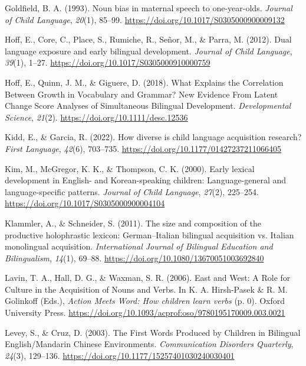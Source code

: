 \documentclass[10pt, letterpaper]{article}
\begin{document}
\begin{CSLReferences}{1}{0}
Goldfield, B. A. (1993). Noun bias in maternal speech to one-year-olds.
\emph{Journal of Child Language}, \emph{20}(1), 85--99.
\url{https://doi.org/10.1017/S0305000900009132}

Hoff, E., Core, C., Place, S., Rumiche, R., Señor, M., \& Parra, M.
(2012). Dual language exposure and early bilingual development.
\emph{Journal of Child Language}, \emph{39}(1), 1--27.
\url{https://doi.org/10.1017/S0305000910000759}

Hoff, E., Quinn, J. M., \& Giguere, D. (2018). What {Explains} the
{Correlation Between Growth} in {Vocabulary} and {Grammar}? {New
Evidence From Latent Change Score Analyses} of {Simultaneous Bilingual
Development}. \emph{Developmental Science}, \emph{21}(2).
\url{https://doi.org/10.1111/desc.12536}

Kidd, E., \& Garcia, R. (2022). How diverse is child language
acquisition research? \emph{First Language}, \emph{42}(6), 703--735.
\url{https://doi.org/10.1177/01427237211066405}

Kim, M., McGregor, K. K., \& Thompson, C. K. (2000). Early lexical
development in {English-} and {Korean-speaking} children:
Language-general and language-specific patterns. \emph{Journal of Child
Language}, \emph{27}(2), 225--254.
\url{https://doi.org/10.1017/S0305000900004104}

Klammler, A., \& Schneider, S. (2011). The size and composition of the
productive holophrastic lexicon: {German}--{Italian} bilingual
acquisition vs. {Italian} monolingual acquisition. \emph{International
Journal of Bilingual Education and Bilingualism}, \emph{14}(1), 69--88.
\url{https://doi.org/10.1080/13670051003692840}

Lavin, T. A., Hall, D. G., \& Waxman, S. R. (2006). East and {West}: {A
Role} for {Culture} in the {Acquisition} of {Nouns} and {Verbs}. In K.
A. Hirsh-Pasek \& R. M. Golinkoff (Eds.), \emph{Action {Meets Word}:
{How} children learn verbs} (p. 0). Oxford University Press.
\url{https://doi.org/10.1093/acprof:oso/9780195170009.003.0021}

Levey, S., \& Cruz, D. (2003). The {First Words Produced} by {Children}
in {Bilingual English}/{Mandarin Chinese Environments}.
\emph{Communication Disorders Quarterly}, \emph{24}(3), 129--136.
\url{https://doi.org/10.1177/15257401030240030401}


\end{CSLReferences}
\end{document}
